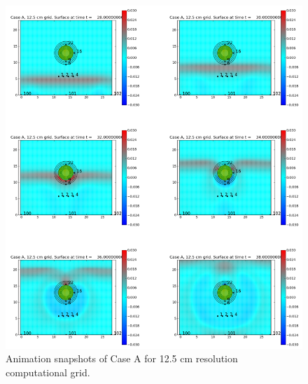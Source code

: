 \begin{figure}[ht]
\hfil\includegraphics[width=7in]{bp6/A12-5Movie.png}\hfil
\caption{\label{A12-5Movie}
Animation snapshots of Case A for 12.5 cm resolution computational grid.
  }
\end{figure}

